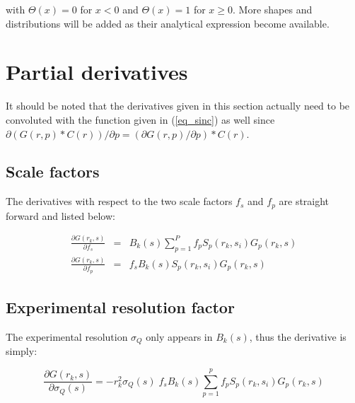 \noindent with  $\Theta(x)=0$ for $x<0$ and $\Theta(x)=1$ for $x
\geq 0$. More shapes and distributions will be added as their
analytical expression become available.


\section{Partial derivatives}

It should be noted that the derivatives given in this section
actually need to be convoluted with the function given in
(\ref{eq_sinc}) as well since $\partial (G(r,p) * C(r)) / \partial p
= (\partial G(r,p) / \partial p) * C(r)$.

\subsection*{Scale factors}

The derivatives with respect to the two scale factors $f_{s}$ and
$f_{p}$ are straight forward and listed below:

\begin{eqnarray}
  \frac{\partial G(r_{k},s)}{\partial f_{s}} & = &
     B_{k}(s) \sum_{p=1}^{P} f_{p} S_{p}(r_{k},s_{i}) G_{p}(r_{k},s) \\
  \frac{\partial G(r_{k},s)}{\partial f_{p}} & = &
     f_{s}B_{k}(s) S_{p}(r_{k},s_{i}) G_{p}(r_{k},s)
  \label{eq_d/ds}
\end{eqnarray}


\subsection*{Experimental resolution factor}

The experimental resolution $\sigma_{Q}$ only appears in $B_{k}(s)$,
thus the derivative is simply:

\begin{equation}
  \frac{\partial G(r_{k},s)}{\partial \sigma_{Q}(s)} =
     - r_{k}^{2} \sigma_{Q}(s) \; f_{s}B_{k}(s)
                 \sum_{p=1}^{p} f_{p} S_{p}(r_{k},s_{i}) G_{p}(r_{k},s)
  \label{eq_d/dsq}
\end{equation}


